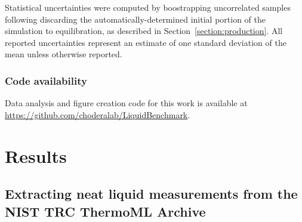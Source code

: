 \documentclass[aps,pre,twocolumn,nofootinbib,superscriptaddress,linenumbers]{revtex4-1}
\begin{document}
Statistical uncertainties were computed by boostrapping uncorrelated samples following discarding the automatically-determined initial portion of the simulation to equilibration, as described in Section~\ref{section:production}.
All reported uncertainties represent an estimate of one standard deviation of the mean unless otherwise reported.

\subsubsection{Code availability}

Data analysis and figure creation code for this work is available at \url{https://github.com/choderalab/LiquidBenchmark}.


\section{Results}

\subsection{Extracting neat liquid measurements from the NIST TRC ThermoML Archive}
\label{section:filtering-thermoml}
\end{document}
